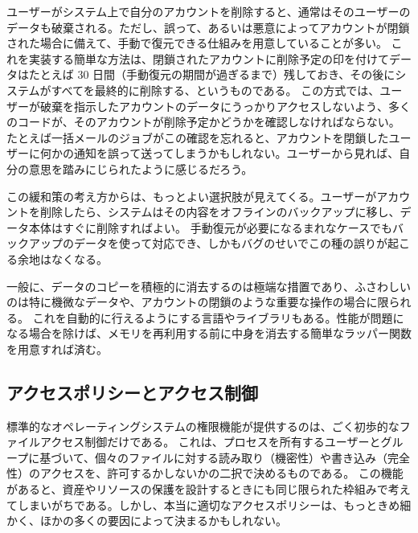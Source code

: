 \documentclass[uplatex]{jsarticle}
\def\label#1{}%
\begin{document}
\begin{exa}[アカウント削除後のデータの扱い]\label{exa:ch3-account-deletion}
ユーザーがシステム上で自分のアカウントを削除すると、通常はそのユーザーのデータも破棄される。ただし、誤って、あるいは悪意によってアカウントが閉鎖された場合に備えて、手動で復元できる仕組みを用意していることが多い。
これを実装する簡単な方法は、閉鎖されたアカウントに削除予定の印を付けてデータはたとえば 30 日間（手動復元の期間が過ぎるまで）残しておき、その後にシステムがすべてを最終的に削除する、というものである。
この方式では、ユーザーが破棄を指示したアカウントのデータにうっかりアクセスしないよう、多くのコードが、そのアカウントが削除予定かどうかを確認しなければならない。
たとえば一括メールのジョブがこの確認を忘れると、アカウントを閉鎖したユーザーに何かの通知を誤って送ってしまうかもしれない。ユーザーから見れば、自分の意思を踏みにじられたように感じるだろう。

この緩和策の考え方からは、もっとよい選択肢が見えてくる。ユーザーがアカウントを削除したら、システムはその内容をオフラインのバックアップに移し、データ本体はすぐに削除すればよい。
手動復元が必要になるまれなケースでもバックアップのデータを使って対応でき、しかもバグのせいでこの種の誤りが起こる余地はなくなる。
\end{exa}

\begin{rem}[データの積極的な消去が適切な場面]\label{rem:ch3-wiping-extreme}
一般に、データのコピーを積極的に消去するのは極端な措置であり、ふさわしいのは特に機微なデータや、アカウントの閉鎖のような重要な操作の場合に限られる。
これを自動的に行えるようにする言語やライブラリもある。性能が問題になる場合を除けば、メモリを再利用する前に中身を消去する簡単なラッパー関数を用意すれば済む。
\end{rem}

\subsection{アクセスポリシーとアクセス制御}\label{subsec:ch3-access-policy}

標準的なオペレーティングシステムの権限機能が提供するのは、ごく初歩的なファイルアクセス制御だけである。
これは、プロセスを所有するユーザーとグループに基づいて、個々のファイルに対する読み取り（機密性）や書き込み（完全性）のアクセスを、許可するかしないかの二択で決めるものである。
この機能があると、資産やリソースの保護を設計するときにも同じ限られた枠組みで考えてしまいがちである。しかし、本当に適切なアクセスポリシーは、もっときめ細かく、ほかの多くの要因によって決まるかもしれない。
\end{document}
